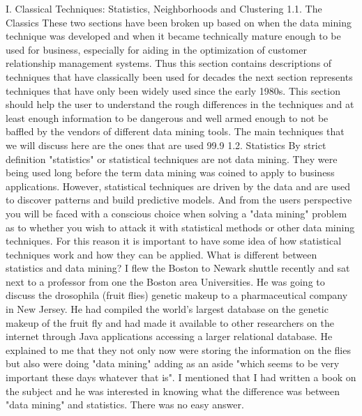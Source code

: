 
I. Classical Techniques: Statistics, Neighborhoods and Clustering
1.1. The Classics
These two sections have been broken up based on when the data mining technique was developed and when it became technically mature enough to be used for business, especially for aiding in the optimization of customer relationship management systems.  Thus this section contains descriptions of techniques that have classically been used for decades the next section represents techniques that have only been widely used since the early 1980s.
This section should help the user to understand the rough differences in the techniques and at least enough information to be dangerous and well armed enough to not be baffled by the vendors of  different data mining tools.
The main techniques that we will discuss here are the ones that are used 99.9%
1.2. Statistics
By strict definition "statistics" or statistical techniques are not data mining.  They were being used long before the term data mining was coined to apply to business applications.  However, statistical techniques are driven by the data and are used to discover patterns and build predictive models.  And from the users perspective you will be faced with a conscious choice when solving a "data mining" problem as to whether you wish to attack it with statistical methods or other data mining techniques.  For this reason it is important to have some idea of how statistical techniques work and how they can be applied.
What is different between statistics and data mining?
I flew the Boston to Newark shuttle recently and sat next to a professor from one the Boston area Universities.  He was going to discuss the  drosophila (fruit flies) genetic makeup to a pharmaceutical company in New Jersey.  He had  compiled the world's largest database on the genetic makeup of the fruit fly and had made it available to other researchers on the internet through Java applications accessing a larger relational database.
He explained to me that they not only now were storing the information on the flies but also were doing "data mining" adding as an aside "which seems to be very important these days whatever that is".  I mentioned that I had written a book on the subject and he was interested in knowing what the difference was between "data mining" and statistics.  There was no easy answer. 
